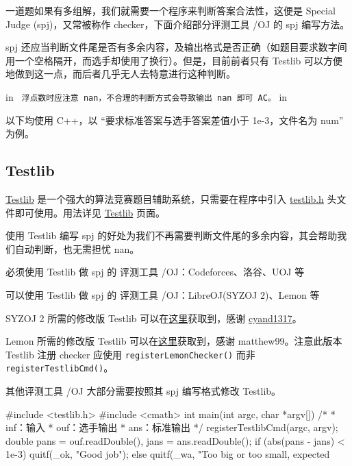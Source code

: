 
一道题如果有多组解，我们就需要一个程序来判断答案合法性，这便是 Special Judge (spj)，又常被称作 checker，下面介绍部分评测工具 /OJ 的 spj 编写方法。

\begin{WARNING}{}{}
spj 还应当判断文件尾是否有多余内容，及输出格式是否正确（如题目要求数字间用一个空格隔开，而选手却使用了换行）。但是，目前前者只有 Testlib 可以方便地做到这一点，而后者几乎无人去特意进行这种判断。
\end{WARNING}


 in
\texttt{
浮点数时应注意 nan，不合理的判断方式会导致输出 nan 即可 AC。}
 in

以下均使用 C++，以 “要求标准答案与选手答案差值小于 1e-3，文件名为 num” 为例。

\subsection{Testlib}

\href{https://codeforces.com/testlib}{Testlib} 是一个强大的算法竞赛题目辅助系统，只需要在程序中引入 \href{https://github.com/MikeMirzayanov/testlib/blob/master/testlib.h}{testlib.h} 头文件即可使用。用法详见 \href{/intro/testlib}{Testlib} 页面。

使用 Testlib 编写 spj 的好处为我们不再需要判断文件尾的多余内容，其会帮助我们自动判断，也无需担忧 nan。

必须使用 Testlib 做 spj 的 评测工具 /OJ：Codeforces、洛谷、UOJ 等

可以使用 Testlib 做 spj 的 评测工具 /OJ：LibreOJ(SYZOJ 2)、Lemon 等

SYZOJ 2 所需的修改版 Testlib 可以在\href{https://pastebin.com/3GANXMG7}{这里}获取到，感谢 \href{https://loj.ac/article/124}{cyand1317}。

Lemon 所需的修改版 Testlib 可以在\href{https://paste.ubuntu.com/p/JsTspHHnmB/}{这里}获取到，感谢 matthew99。注意此版本 Testlib 注册 checker 应使用 \texttt{registerLemonChecker()} 而非 \texttt{registerTestlibCmd()}。

其他评测工具 /OJ 大部分需要按照其 spj 编写格式修改 Testlib。

\begin{cppcode}
#include <testlib.h>
#include <cmath>
int main(int argc, char *argv[]) {
  /*
   * inf：输入
   * ouf：选手输出
   * ans：标准输出
   */
  registerTestlibCmd(argc, argv);
  double pans = ouf.readDouble(), jans = ans.readDouble();
  if (abs(pans - jans) < 1e-3)
    quitf(_ok, "Good job");
  else
    quitf(_wa, "Too big or too small, expected %
}
\end{cppcode}

